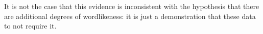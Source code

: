 
It is not the case that this evidence is inconsistent with the hypothesis that there are additional degrees of wordlikeness: it is just a demonstration that these data to not require it. 
